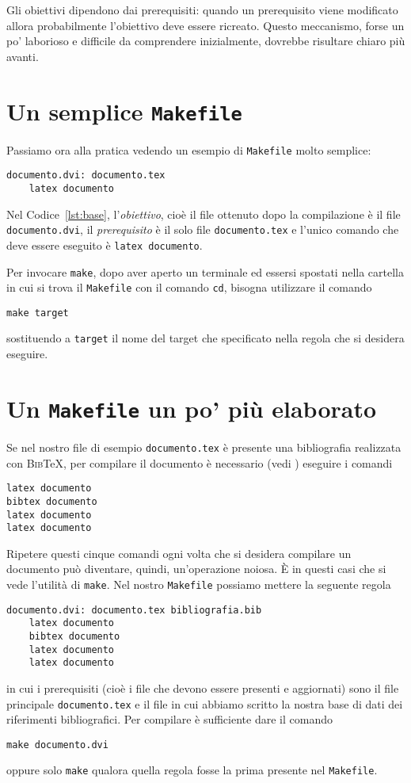 Gli obiettivi dipendono dai prerequisiti: quando un prerequisito viene
modificato allora probabilmente l'obiettivo deve essere ricreato.  Questo
meccanismo, forse un po' laborioso e difficile da comprendere inizialmente,
dovrebbe risultare chiaro più avanti.


\section{Un semplice \texttt{Makefile}}
\label{sec:makefile-semplice}

Passiamo ora alla pratica vedendo un esempio di \verb|Makefile| molto semplice:
\begin{lstlisting}[caption={Un semplice \texttt{Makefile}},label=lst:base,
showtabs=true,tab=\rightarrowfill]
documento.dvi: documento.tex
	latex documento
\end{lstlisting}
Nel Codice~\ref{lst:base}, l'\emph{obiettivo}, cioè il file ottenuto dopo la
compilazione è il file \verb|documento.dvi|, il \emph{prerequisito} è il solo
file \verb|documento.tex| e l'unico comando che deve essere eseguito è
\verb|latex documento|.

Per invocare \verb|make|, dopo aver aperto un terminale ed essersi spostati
nella cartella in cui si trova il \verb|Makefile| con il comando \verb|cd|,
bisogna utilizzare il comando
\begin{verbatim}
make target
\end{verbatim}
sostituendo a \verb|target| il nome del target che specificato nella regola che
si desidera eseguire.


\section{Un \texttt{Makefile} un po' più elaborato}
\label{sec:makefile-elaborato}

Se nel nostro file di esempio \verb|documento.tex| è presente una bibliografia
realizzata con \textsc{Bib}\TeX, per compilare il documento è necessario (vedi
\textcite[120]{pantieri:latex}) eseguire i comandi
\begin{verbatim}
latex documento
bibtex documento
latex documento
latex documento
\end{verbatim}

Ripetere questi cinque comandi ogni volta che si desidera compilare un documento
può diventare, quindi, un'operazione noiosa.  È in questi casi che si vede
l'utilità di \verb|make|.  Nel nostro \verb|Makefile| possiamo mettere la
seguente regola
\begin{lstlisting}
documento.dvi: documento.tex bibliografia.bib
	latex documento
	bibtex documento
	latex documento
	latex documento
\end{lstlisting}
in cui i prerequisiti (cioè i file che devono essere presenti e aggiornati) sono
il file principale \verb|documento.tex| e il file in cui abbiamo scritto la
nostra base di dati dei riferimenti bibliografici.  Per compilare è sufficiente
dare il comando
\begin{verbatim}
make documento.dvi
\end{verbatim}
oppure solo \verb|make| qualora quella regola fosse la prima presente nel
\verb|Makefile|.

